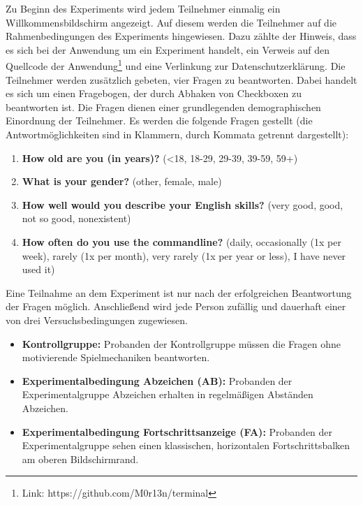 Zu Beginn des Experiments wird jedem Teilnehmer einmalig ein Willkommensbildschirm angezeigt. Auf diesem werden die Teilnehmer auf die Rahmenbedingungen des Experiments hingewiesen. Dazu zählte der Hinweis, dass es sich bei der Anwendung um ein Experiment handelt, ein Verweis auf den Quellcode der Anwendung\footnote{Link: https://github.com/M0r13n/terminal} und eine Verlinkung zur Datenschutzerklärung. Die Teilnehmer werden zusätzlich gebeten, vier Fragen zu beantworten. Dabei handelt es sich um einen Fragebogen, der durch Abhaken von Checkboxen zu beantworten ist. Die Fragen dienen einer grundlegenden demographischen Einordnung der Teilnehmer. Es werden die folgende Fragen gestellt (die Antwortmöglichkeiten sind in Klammern, durch Kommata getrennt dargestellt):

\begin{enumerate}\label{demography}
	 \item \textbf{How old are you (in years)?} (<18, 18-29, 29-39, 39-59, 59+)
     \item \textbf{What is your gender?} (other, female, male)
     \item \textbf{How well would you describe your English skills?} (very good, good, not so good, nonexistent)
     \item \textbf{How often do you use the commandline?} (daily, occasionally (1x per week), rarely (1x per month), very rarely (1x per year or less), I have never used it)
\end{enumerate}

Eine Teilnahme an dem Experiment ist nur nach der erfolgreichen Beantwortung der Fragen möglich. Anschließend wird jede Person zufällig und dauerhaft einer von drei Versuchsbedingungen zugewiesen.


\begin{itemize}
	\item \textbf{Kontrollgruppe:} Probanden der Kontrollgruppe müssen die Fragen ohne motivierende Spielmechaniken beantworten.
	 
    \item \textbf{Experimentalbedingung Abzeichen (AB):} Probanden der Experimentalgruppe Abzeichen erhalten in regelmäßigen Abständen Abzeichen.

    \item \textbf{Experimentalbedingung Fortschrittsanzeige (FA):} Probanden der Experimentalgruppe sehen einen klassischen, horizontalen Fortschrittsbalken am oberen Bildschirmrand.
\end{itemize}

